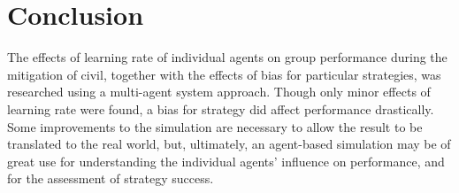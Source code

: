 \section{Conclusion}
The effects of learning rate of individual agents on group performance during the mitigation of civil, together with the effects of bias for particular strategies, was researched using a multi-agent system approach. Though only minor effects of learning rate were found, a bias for strategy did affect performance drastically. Some improvements to the simulation are necessary to allow the result to be translated to the real world, but, ultimately, an agent-based simulation may be of great use for understanding the individual agents' influence on performance, and for the assessment of strategy success. 